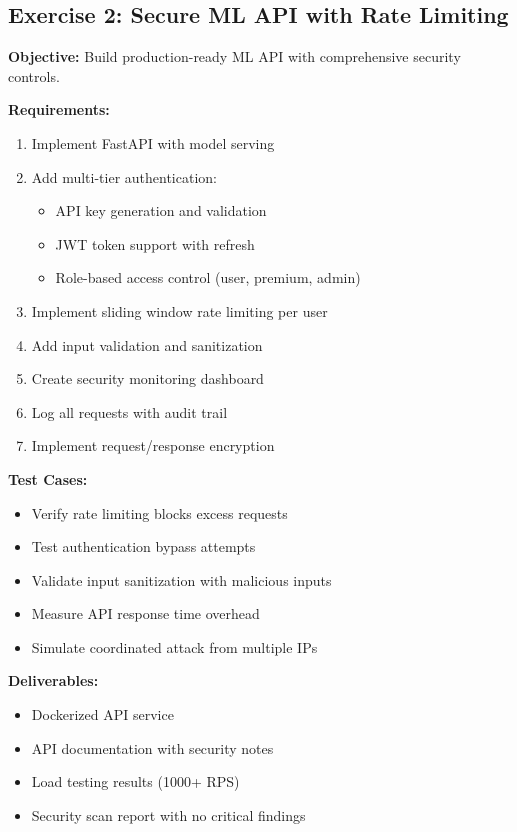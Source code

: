 \subsection{Exercise 2: Secure ML API with Rate Limiting}

\textbf{Objective:} Build production-ready ML API with comprehensive security controls.

\textbf{Requirements:}
\begin{enumerate}
    \item Implement FastAPI with model serving
    \item Add multi-tier authentication:
    \begin{itemize}
        \item API key generation and validation
        \item JWT token support with refresh
        \item Role-based access control (user, premium, admin)
    \end{itemize}
    \item Implement sliding window rate limiting per user
    \item Add input validation and sanitization
    \item Create security monitoring dashboard
    \item Log all requests with audit trail
    \item Implement request/response encryption
\end{enumerate}

\textbf{Test Cases:}
\begin{itemize}
    \item Verify rate limiting blocks excess requests
    \item Test authentication bypass attempts
    \item Validate input sanitization with malicious inputs
    \item Measure API response time overhead
    \item Simulate coordinated attack from multiple IPs
\end{itemize}

\textbf{Deliverables:}
\begin{itemize}
    \item Dockerized API service
    \item API documentation with security notes
    \item Load testing results (1000+ RPS)
    \item Security scan report with no critical findings
\end{itemize}

